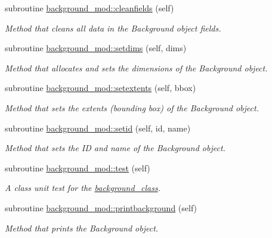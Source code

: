 \begin{DoxyCompactItemize}
subroutine \mbox{\hyperlink{namespacebackground__mod_a843a471a68ce83809e3ed0a40886a4e7}{background\+\_\+mod\+::cleanfields}} (self)
\begin{DoxyCompactList}\small\item\em Method that cleans all data in the Background object fields. \end{DoxyCompactList}\item 
subroutine \mbox{\hyperlink{namespacebackground__mod_a06d96d4627391d74feb105a842a87dc0}{background\+\_\+mod\+::setdims}} (self, dims)
\begin{DoxyCompactList}\small\item\em Method that allocates and sets the dimensions of the Background object. \end{DoxyCompactList}\item 
subroutine \mbox{\hyperlink{namespacebackground__mod_ae8871564866fdd657a25f6a5a2256c33}{background\+\_\+mod\+::setextents}} (self, bbox)
\begin{DoxyCompactList}\small\item\em Method that sets the extents (bounding box) of the Background object. \end{DoxyCompactList}\item 
subroutine \mbox{\hyperlink{namespacebackground__mod_a4feaccf688558d8590ece4f09c65c977}{background\+\_\+mod\+::setid}} (self, id, name)
\begin{DoxyCompactList}\small\item\em Method that sets the ID and name of the Background object. \end{DoxyCompactList}\item 
subroutine \mbox{\hyperlink{namespacebackground__mod_a3cee95b9b5d3aae83df33334981f2b27}{background\+\_\+mod\+::test}} (self)
\begin{DoxyCompactList}\small\item\em A class \textquotesingle{}unit\textquotesingle{} test for the \mbox{\hyperlink{structbackground__mod_1_1background__class}{background\+\_\+class}}. \end{DoxyCompactList}\item 
subroutine \mbox{\hyperlink{namespacebackground__mod_a8a8f225cffcddb742f22a402155b703f}{background\+\_\+mod\+::printbackground}} (self)
\begin{DoxyCompactList}\small\item\em Method that prints the Background object. \end{DoxyCompactList}\item 

\end{DoxyCompactItemize}
